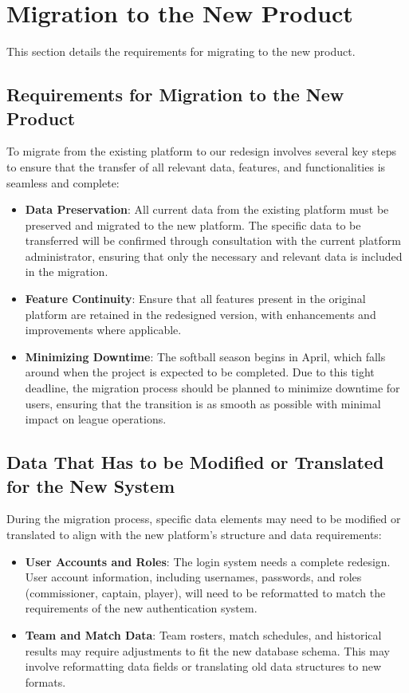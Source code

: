 \documentclass[12pt, titlepage]{article}
\begin{document}
\section{Migration to the New Product}
This section details the requirements for migrating to the new product.
\subsection{Requirements for Migration to the New Product}
To migrate from the existing platform to our redesign involves several key steps to ensure that the transfer of all relevant data, features, and functionalities is seamless and complete:

\begin{itemize}
    \item \textbf{Data Preservation}: All current data from the existing platform must be preserved and migrated to the new platform. The specific data to be transferred will be confirmed through consultation with the current platform administrator, ensuring that only the necessary and relevant data is included in the migration.
    \item \textbf{Feature Continuity}: Ensure that all features present in the original platform are retained in the redesigned version, with enhancements and improvements where applicable.
    \item \textbf{Minimizing Downtime}: The softball season begins in April, which falls around when the project is expected to be completed. Due to this tight deadline, the migration process should be planned to minimize downtime for users, ensuring that the transition is as smooth as possible with minimal impact on league operations.
\end{itemize}

\subsection{Data That Has to be Modified or Translated for the New System}
During the migration process, specific data elements may need to be modified or translated to align with the new platform's structure and data requirements:

\begin{itemize}
    \item \textbf{User Accounts and Roles}: The login system needs a complete redesign. User account information, including usernames, passwords, and roles (commissioner, captain, player), will need to be reformatted to match the requirements of the new authentication system.
    \item \textbf{Team and Match Data}: Team rosters, match schedules, and historical results may require adjustments to fit the new database schema. This may involve reformatting data fields or translating old data structures to new formats.
\end{itemize}
\end{document}
